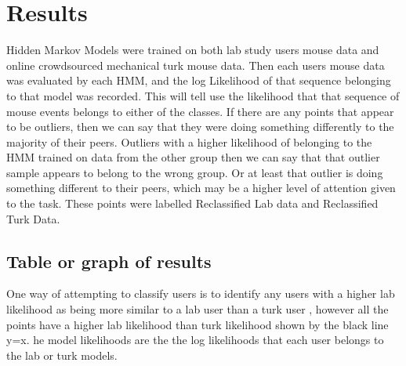 \documentclass{article}
\begin{document}
\section{Results}

Hidden Markov Models were trained on both lab study users mouse data and online crowdsourced mechanical turk mouse data.
Then each users mouse data was evaluated by each HMM, and the log Likelihood of that sequence belonging to that model was recorded. 
This will tell use the likelihood that that sequence of mouse events belongs to either of the classes.
If there are any points that appear to be outliers, then we can say that they were doing something differently to the majority of their peers.
Outliers with a higher likelihood of belonging to the HMM trained on data from the other group then we can say that that outlier sample appears to belong to the wrong group.
Or at least that outlier is doing something different to their peers, which may be a higher level of attention given to the task. 
These points were labelled Reclassified Lab data and Reclassified Turk Data.

\subsection{Table or graph of results}

One way of attempting to classify users is to identify any users with a higher lab likelihood as being more similar to a lab user than a turk user
, however all the points have a higher lab likelihood than turk likelihood shown by the black line y=x.
he model likelihoods are the the log likelihoods that each user belongs to the lab or turk models. 

\end{document}
